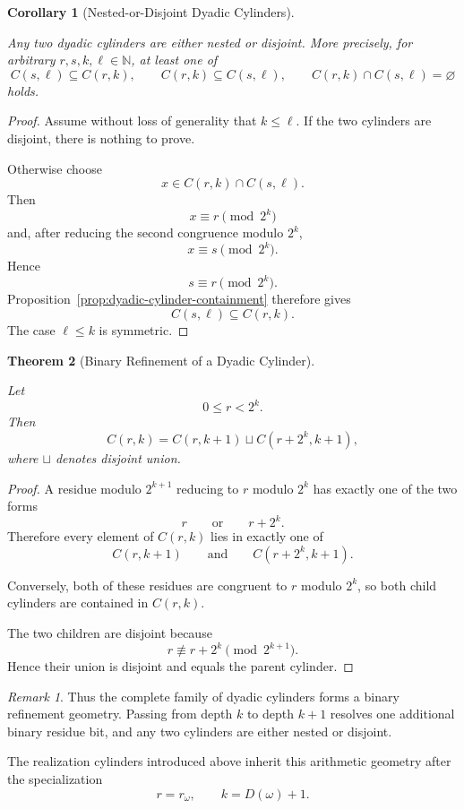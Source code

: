 \documentclass[12pt, oneside]{article}
\numberwithin{equation}{section}
\theoremstyle{definition}
\theoremstyle{plain}
\newtheorem{theorem}{Theorem}[section]
\newtheorem{corollary}[theorem]{Corollary}
\theoremstyle{remark}
\newtheorem*{remark}{Remark}
\begin{document}
\begin{corollary}[Nested-or-Disjoint Dyadic Cylinders]
\label{cor:dyadic-cylinders-nested-disjoint}

Any two dyadic cylinders are either nested or disjoint. More precisely,
for arbitrary \(r,s,k,\ell\in\mathbb N\), at least one of
\[
C(s,\ell)\subseteq C(r,k),
\qquad
C(r,k)\subseteq C(s,\ell),
\qquad
C(r,k)\cap C(s,\ell)=\varnothing
\]
holds.
\end{corollary}

\begin{proof}
Assume without loss of generality that \(k\le\ell\). If the two cylinders
are disjoint, there is nothing to prove.

Otherwise choose
\[
x\in C(r,k)\cap C(s,\ell).
\]
Then
\[
x\equiv r\pmod{2^k}
\]
and, after reducing the second congruence modulo \(2^k\),
\[
x\equiv s\pmod{2^k}.
\]
Hence
\[
s\equiv r\pmod{2^k}.
\]
Proposition~\ref{prop:dyadic-cylinder-containment} therefore gives
\[
C(s,\ell)\subseteq C(r,k).
\]
The case \(\ell\le k\) is symmetric.
\end{proof}

\begin{theorem}[Binary Refinement of a Dyadic Cylinder]
\label{thm:dyadic-cylinder-binary-refinement}

Let
\[
0\le r<2^k.
\]
Then
\[
C(r,k)
=
C(r,k+1)
\sqcup
C(r+2^k,k+1),
\]
where \(\sqcup\) denotes disjoint union.
\end{theorem}

\begin{proof}
A residue modulo \(2^{k+1}\) reducing to \(r\) modulo \(2^k\) has exactly
one of the two forms
\[
r
\qquad\text{or}\qquad
r+2^k.
\]
Therefore every element of \(C(r,k)\) lies in exactly one of
\[
C(r,k+1)
\qquad\text{and}\qquad
C(r+2^k,k+1).
\]

Conversely, both of these residues are congruent to \(r\) modulo \(2^k\),
so both child cylinders are contained in \(C(r,k)\).

The two children are disjoint because
\[
r\not\equiv r+2^k\pmod{2^{k+1}}.
\]
Hence their union is disjoint and equals the parent cylinder.
\end{proof}

\begin{remark}
Thus the complete family of dyadic cylinders forms a binary refinement
geometry. Passing from depth \(k\) to depth \(k+1\) resolves one additional
binary residue bit, and any two cylinders are either nested or disjoint.

The realization cylinders introduced above inherit this arithmetic geometry
after the specialization
\[
r=r_\omega,
\qquad
k=D(\omega)+1.
\]
\end{remark}
\end{document}

